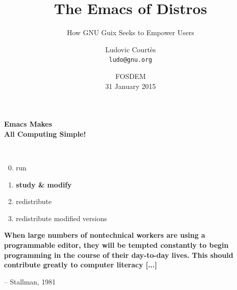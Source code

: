 \documentclass{beamer}
\title{The Emacs of Distros}
\subtitle{How GNU Guix Seeks to Empower Users}
\author{Ludovic Courtès\\\texttt{ludo@gnu.org}}
\date{\small{FOSDEM\\31 January 2015}}
\begin{document}
\maketitle

\begin{frame}[fragile]

  \huge{\textbf{Emacs Makes\\All Computing Simple!}}
  \\[1.3cm]
\end{frame}

\begin{frame}[fragile]
  \\[1cm]
  \begin{enumerate}
    \setcounter{enumi}{-1}
  \item run
  \item \textbf<2->{study \& modify}
  \item redistribute
  \item redistribute modified versions
  \end{enumerate}
\end{frame}

\begin{frame}[fragile]
  \textrm{\LARGE{\textbf{ When large numbers of nontechnical workers are
        using a programmable editor, they will be tempted constantly
        \alert{to begin programming} in the course of their day-to-day
        lives.  This should contribute greatly to computer literacy
        [...]
  }}}

  \vspace{1cm}
  \hfill{-- Stallman, 1981}
\end{frame}
\end{document}
